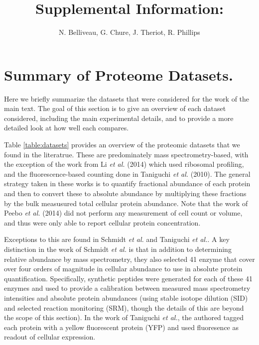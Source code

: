 \documentclass[11pt, letterpaper]{article}
\author{N. Belliveau, G. Chure, J. Theriot, R. Phillips}
\begin{document}
\title{Supplemental Information: }
\maketitle

\section{Summary of Proteome Datasets.}

Here we briefly summarize the datasets that were considered for the work of the main
text. The goal of this section is to give an overview of each dataset
considered, including the main experimental details, and to provide a more
detailed look at how well each compares.

Table \ref{table:datasets} provides an overview of the proteomic datasets that
we found in the literatrue. These are predominately mass spectrometry-based,
with the exception of the work from Li {\it et al.} (2014) which used ribosomal
profiling, and the fluorescence-based counting done in Taniguchi {\it et al.}
(2010). The general strategy taken in these works is to quantify fractional
abundance of each protein and then to convert these to absolute abundance by
multiplying these fractions by the bulk measusured total cellular protein
abundance. Note that the work of Peebo {\it et al.} (2014) did not perform any
measurement of cell count or volume, and thus were only able to report cellular
protein concentration.

Exceptions to this are found in Schmidt {\it et al.} and Taniguchi {\it et al.}.
A key distinction in the work of Schmidt {\it et al.} is that in addition to
determining relative abundance by mass spectrometry, they also selected 41
enzyme that cover over four orders of magnitude in cellular abundance to use in
absolute protein quantification. Specifically, synthetic peptides were generated
for each of these 41 enzymes and used to provide a calibration between measured
mass spectrometry intensities and absolute protein abundances (using stable
isotope dilution (SID) and selected reaction monitoring (SRM), though the
details of this are beyond the scope of this section). In the work of Taniguchi
{\it et al.},  the authored tagged each protein with a  yellow fluorescent
protein (YFP) and used fluoresence as readout of cellular expression.
\end{document}
